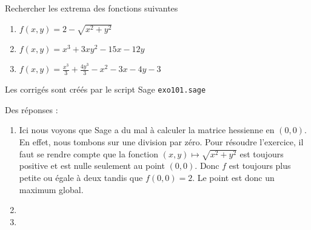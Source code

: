 \begin{example}     \label{exZHGRooTQpVpq}


	 Rechercher les extrema des fonctions suivantes
	\begin{enumerate}

		\item
			$f(x,y)=2-\sqrt{x^2+y^2}$
		\item
			$f(x,y)=x^3+3xy^2-15x-12y$
		\item
			$f(x,y)=\frac{ x^3 }{ 3 }+\frac{ 4y^3 }{ 3 }-x^2-3x-4y-3$

	\end{enumerate}




	Les corrigés sont créés par le script Sage \verb+exo101.sage+


	Des réponses :

	\begin{enumerate}

		\item

			Ici nous voyons que Sage a du mal à calculer la matrice hessienne en $(0,0)$. En effet, nous tombons sur une division par zéro. Pour résoudre l'exercice, il faut se rendre compte que la fonction $(x,y)\mapsto\sqrt{x^2+y^2}$ est toujours positive et est nulle seulement au point $(0,0)$. Donc $f$ est toujours plus petite ou égale à deux tandis que $f(0,0)=2$. Le point est donc un maximum global.
		\item

		\item

	\end{enumerate}

\end{example}

